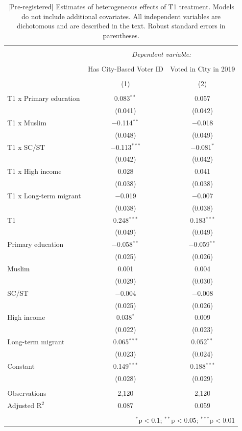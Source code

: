 \documentclass[
  11.5pt,
]{article}
\begin{document}
\begin{table}[!htbp] \centering 
  \caption{[Pre-registered] Estimates of heterogeneous effects of T1 treatment. Models do not include additional covariates. All independent variables are dichotomous and are described in the text. Robust standard errors in parentheses.} 
  \label{} 
\small 
\begin{tabular}{@{\extracolsep{5pt}}lcc} 
\\[-1.8ex]\hline 
\hline \\[-1.8ex] 
 & \multicolumn{2}{c}{\textit{Dependent variable:}} \\ 
\cline{2-3} 
\\[-1.8ex] & Has City-Based Voter ID & Voted in City in 2019 \\ 
\\[-1.8ex] & (1) & (2)\\ 
\hline \\[-1.8ex] 
 T1 x Primary education & 0.083$^{**}$ & 0.057 \\ 
  & (0.041) & (0.042) \\ 
  T1 x Muslim & $-$0.114$^{**}$ & $-$0.018 \\ 
  & (0.048) & (0.049) \\ 
  T1 x SC/ST & $-$0.113$^{***}$ & $-$0.081$^{*}$ \\ 
  & (0.042) & (0.042) \\ 
  T1 x High income & 0.028 & 0.041 \\ 
  & (0.038) & (0.038) \\ 
  T1 x Long-term migrant & $-$0.019 & $-$0.007 \\ 
  & (0.038) & (0.038) \\ 
  T1 & 0.248$^{***}$ & 0.183$^{***}$ \\ 
  & (0.049) & (0.049) \\ 
  Primary education & $-$0.058$^{**}$ & $-$0.059$^{**}$ \\ 
  & (0.025) & (0.026) \\ 
  Muslim & 0.001 & 0.004 \\ 
  & (0.029) & (0.030) \\ 
  SC/ST & $-$0.004 & $-$0.008 \\ 
  & (0.025) & (0.026) \\ 
  High income & 0.038$^{*}$ & 0.009 \\ 
  & (0.022) & (0.023) \\ 
  Long-term migrant & 0.065$^{***}$ & 0.052$^{**}$ \\ 
  & (0.023) & (0.024) \\ 
  Constant & 0.149$^{***}$ & 0.188$^{***}$ \\ 
  & (0.028) & (0.029) \\ 
 \hline \\[-1.8ex] 
Observations & 2,120 & 2,120 \\ 
Adjusted R$^{2}$ & 0.087 & 0.059 \\ 
\hline 
\hline \\[-1.8ex] 
\multicolumn{3}{r}{$^{*}$p$<$0.1; $^{**}$p$<$0.05; $^{***}$p$<$0.01} \\ 
\end{tabular} 
\end{table}
\end{document}
